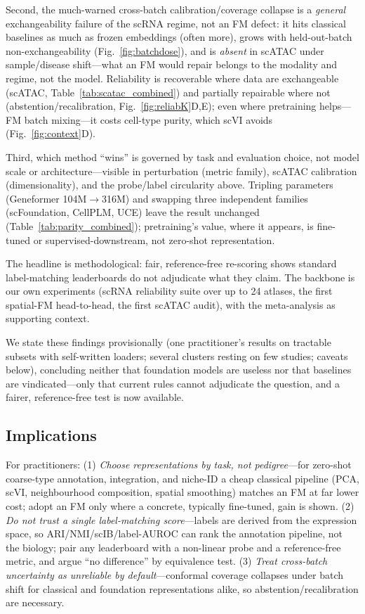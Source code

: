 \documentclass[journal]{IEEEtran}
\begin{document}
Second, the much-warned cross-batch calibration/coverage collapse is a \emph{general} exchangeability failure of the scRNA regime, not an FM defect: it hits classical baselines as much as frozen embeddings (often more), grows with held-out-batch non-exchangeability (Fig.~\ref{fig:batchdose}), and is \emph{absent} in scATAC under sample/disease shift---what an FM would repair belongs to the modality and regime, not the model. Reliability is recoverable where data are exchangeable (scATAC, Table~\ref{tab:scatac_combined}) and partially repairable where not (abstention/recalibration, Fig.~\ref{fig:reliabK}D,E); even where pretraining helps---FM batch mixing---it costs cell-type purity, which scVI avoids (Fig.~\ref{fig:context}D).

Third, which method ``wins'' is governed by task and evaluation choice, not model scale or architecture---visible in perturbation (metric family), scATAC calibration (dimensionality), and the probe/label circularity above. Tripling parameters (Geneformer 104M$\to$316M) and swapping three independent families (scFoundation, CellPLM, UCE) leave the result unchanged (Table~\ref{tab:parity_combined}); pretraining's value, where it appears, is fine-tuned or supervised-downstream, not zero-shot representation.

The headline is methodological: fair, reference-free re-scoring shows standard label-matching leaderboards do not adjudicate what they claim. The backbone is our own experiments (scRNA reliability suite over up to 24 atlases, the first spatial-FM head-to-head, the first scATAC audit), with the meta-analysis as supporting context.

We state these findings provisionally (one practitioner's results on tractable subsets with self-written loaders; several clusters resting on few studies; caveats below), concluding neither that foundation models are useless nor that baselines are vindicated---only that current rules cannot adjudicate the question, and a fairer, reference-free test is now available.

\subsection*{Implications}
For practitioners: (1) \emph{Choose representations by task, not pedigree}---for zero-shot coarse-type annotation, integration, and niche-ID a cheap classical pipeline (PCA, scVI, neighbourhood composition, spatial smoothing) matches an FM at far lower cost; adopt an FM only where a concrete, typically fine-tuned, gain is shown. (2) \emph{Do not trust a single label-matching score}---labels are derived from the expression space, so ARI/NMI/scIB/label-AUROC can rank the annotation pipeline, not the biology; pair any leaderboard with a non-linear probe and a reference-free metric, and argue ``no difference'' by equivalence test. (3) \emph{Treat cross-batch uncertainty as unreliable by default}---conformal coverage collapses under batch shift for classical and foundation representations alike, so abstention/recalibration are necessary.
\end{document}
